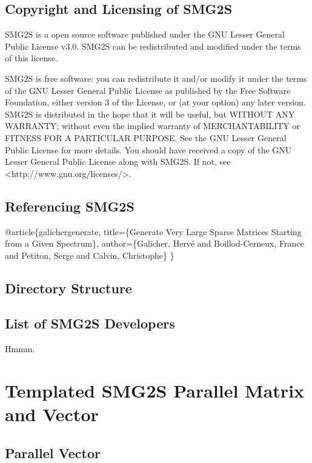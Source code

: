 \documentclass[letterpaper, 10 pt]{report}
\begin{document}
	\section{Copyright and Licensing of SMG2S}
	
	SMG2S is a open source software published under the GNU Lesser General Public License v3.0. SMG2S can be redistributed and modified under the terms of this license.
	
	SMG2S is free software: you can redistribute it and/or modify
	it under the terms of the GNU Lesser General Public License as published
	by the Free Software Foundation, either version 3 of the License, or
	(at your option) any later version.
	SMG2S is distributed in the hope that it will be useful,
	but WITHOUT ANY WARRANTY; without even the implied warranty of
	MERCHANTABILITY or FITNESS FOR A PARTICULAR PURPOSE.  See the
	GNU Lesser General Public License for more details.
	You should have received a copy of the GNU Lesser General Public License
	along with SMG2S.  If not, see <http://www.gnu.org/licenses/>.
	
	\section{Referencing SMG2S}
	
	@article\{galichergenerate, title=\{Generate Very Large Sparse Matrices Starting from a Given Spectrum\},  author=\{Galicher, Herv{\'e} and Boillod-Cerneux, France and Petiton, Serge and Calvin, Christophe\}
	\}
	\section{Directory Structure}
	\section{List of SMG2S Developers}
	
	Hmmm.
	\newpage
	
	\chapter{Templated  SMG2S Parallel Matrix and Vector}
	\section{Parallel Vector}
\end{document}

